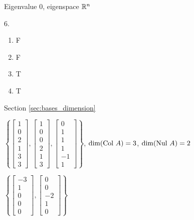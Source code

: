 \begin{multicols}{2}
\item Eigenvalue $0$, eigenspace $\mathbb{R}^n$ 

\ea

\oee

\be
\item[6.]
\begin{enumerate}[label=(\alph*), leftmargin=1\parindent]
\item F
\item F
\item T
\item T


	\end{enumerate}
	
	
\ee

\hspace{-0.25in} Section \ref{sec:bases_dimension}

\obe
\item 
\ba
\item $\left\{ \left[ \begin{array}{c} 1\\ 0 \\ 2\\ 1 \\ 3\\ 3 \end{array} \right], \left[ \begin{array}{c} 1\\ 0 \\ 0\\ 2 \\ 1\\ 3 \end{array} \right], \left[ \begin{array}{r} 0\\ 1 \\ 1\\ 1 \\ -1\\ 1 \end{array} \right] \right\}$, $\dim(\text{Col } A) = 3$, $\dim(\text{Nul } A) = 2$

\item $\left\{ \left[ \begin{array}{r} -3\\1\\0\\0\\0\end{array} \right], \left[ \begin{array}{r} 0\\0\\-2\\1\\0\end{array} \right] \right\}$


\end{multicols}
